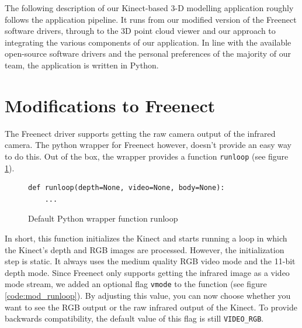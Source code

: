 

The following description of our Kinect-based 3-D modelling application roughly
follows the application pipeline. It runs from our modified version of the
Freenect software drivers, through to the 3D point cloud viewer and our approach
to integrating the various components of our application. In line with the
available open-source software drivers and the personal preferences of the
majority of our team, the application is written in Python.


\section{Modifications to Freenect}
\label{sec:mod_to_freenect}

The Freenect driver supports getting the raw camera output of the infrared
camera. The python wrapper for Freenect however, doesn't provide an easy way to
do this. Out of the box, the wrapper provides a function \verb|runloop| (see
figure \ref{code:def_runloop}).

\begin{figure}[H]
\begin{lstlisting}
def runloop(depth=None, video=None, body=None):
    ...
\end{lstlisting}
\caption{Default Python wrapper function runloop}
\label{code:def_runloop}
\end{figure}

In short, this function initializes the Kinect and starts running a loop in
which the Kinect's depth and RGB images are processed. However, the
initialization step is static. It always uses the medium quality RGB video mode
and the 11-bit depth mode. Since Freenect only supports getting the infrared
image as a video mode stream, we added an optional flag \verb|vmode| to the
function (see figure \ref{code:mod_runloop}). By adjusting this value, you can
now choose whether you want to see the RGB output or the raw infrared output of
the Kinect. To provide backwards compatibility, the default value of this flag
is still \verb|VIDEO_RGB|.

